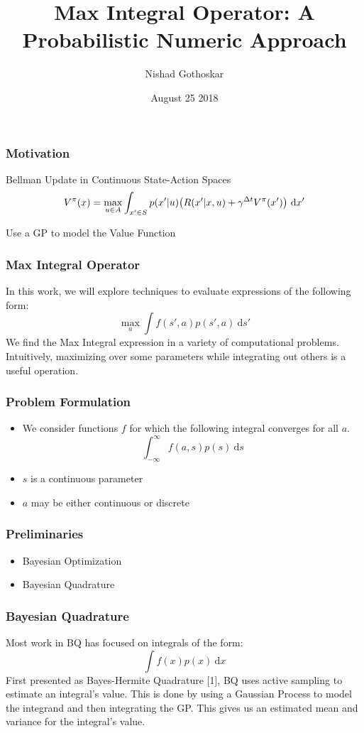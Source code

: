 \documentclass[11pt]{beamer}
\title{Max Integral Operator: A Probabilistic Numeric Approach}
\author{Nishad Gothoskar}
\institute{Learning and Intelligent Systems - MIT}
\date{August 25 2018}
\begin{document}
 
\frame{\titlepage}
 
 \begin{frame}
 \frametitle{Motivation}
Bellman Update in Continuous State-Action Spaces
 \[V^{\pi}(x) = \max_{u \in A} \int_{x' \in S} p(x'|u)\big(R(x'|x,u) + \gamma^{\Delta t}V^{\pi}(x')\big) \ \textup{d}x' \]
 
 Use a GP to model the Value Function
 
\end{frame}


\begin{frame}
\frametitle{Max Integral Operator}
In this work, we will explore techniques to evaluate expressions of the following form:
\begin{equation*}
    \max_{a} \int f(s', a) p(s', a) \ \text{d}s'
\end{equation*}
\newline
We find the Max Integral expression in a variety of computational problems.
\hfill \newline
Intuitively, maximizing over some parameters while integrating out others is a useful operation.
\end{frame}

\begin{frame}
\frametitle{Problem Formulation}
\begin{itemize}
	\item We consider functions $f$ for which the following integral converges for all $a$.
	\begin{equation*}
	\int_{- \infty}^{\infty} f(a,s) p(s) \ \text{d}s
	\end{equation*}
	\item $s$ is a continuous parameter
	\item $a$ may be either continuous or discrete
	
\end{itemize}

\end{frame}

\begin{frame}
\frametitle{Preliminaries}
\begin{itemize}
	\item Bayesian Optimization
	\item Bayesian Quadrature
\end{itemize}
\end{frame}

\begin{frame}
\frametitle{Bayesian Quadrature}
Most work in BQ has focused on integrals of the form:
\begin{equation*}
\int f(x) p(x)  \ \text{d}x
\end{equation*}
First presented as Bayes-Hermite Quadrature [1], BQ uses active sampling to estimate an integral's value. This is done by using a Gaussian Process to model the integrand and then integrating the GP.
\newline\newline
This gives us an estimated mean and variance for the integral's value.
\end{frame}
\end{document}
